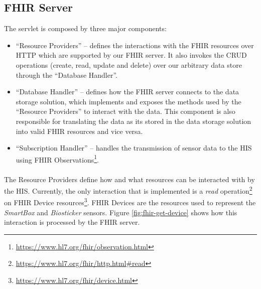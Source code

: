 \subsection{FHIR Server} 

The servlet is composed by three major components:

\begin{itemize}
    \item ``Resource Providers'' -- defines the interactions with the \acs{FHIR} resources over \acs{HTTP} which are supported by our \acs{FHIR} server. It also invokes the CRUD operations (create, read, update and delete) over our arbitrary data store through the ``Database Handler''.
    \item ``Database Handler'' -- defines how the \acs{FHIR} server connects to the data storage solution, which implements and exposes the methods used by the ``Resource Providers'' to interact with the data. This component is also responsible for translating the data as its stored in the data storage solution into valid \acs{FHIR} resources and vice versa.
    \item ``Subscription Handler'' -- handles the transmission of sensor data to the \acs{HIS} using \acs{FHIR} Observations\footnote{\url{https://www.hl7.org/fhir/observation.html}}.
\end{itemize}

\paragraph{} The Resource Providers define how and what resources can be interacted with by the \acs{HIS}. Currently, the only interaction that is implemented is a \textit{read} operation\footnote{\url{https://www.hl7.org/fhir/http.html\#read}} on \acs{FHIR} Device resources\footnote{\url{https://www.hl7.org/fhir/device.html}}. \acs{FHIR} Devices are the resources used to represent the \textit{SmartBox} and \textit{Biosticker} sensors. Figure \ref{fig:fhir-get-device} shows how this interaction is processed by the \acs{FHIR} server.

